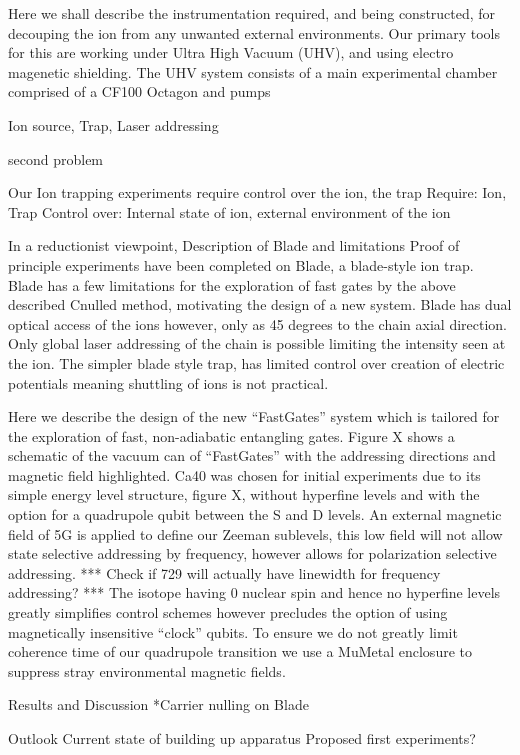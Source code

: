 Here we shall describe the instrumentation required, and being constructed, for decouping the ion from any unwanted external environments. Our primary tools for this are working under Ultra High Vacuum (UHV), and using electro magenetic shielding. The UHV system consists of a main experimental chamber comprised of a CF100 Octagon and pumps









Ion source,
Trap,
Laser addressing

second problem

Our Ion trapping experiments require control over the ion, the trap
Require:
Ion, Trap
Control over:
Internal state of ion, external environment of the ion

In a reductionist viewpoint, 
Description of Blade and limitations Proof of principle experiments
have been completed on Blade, a blade-style ion trap. Blade has a few
limitations for the exploration of fast gates by the above described
Cnulled method, motivating the design of a new system.  Blade has dual
optical access of the ions however, only as 45 degrees to the chain
axial direction. Only global laser addressing of the chain is possible
limiting the intensity seen at the ion. The simpler blade style trap,
has limited control over creation of electric potentials meaning
shuttling of ions is not practical.


\subtitle{FastGates Apparatus}

Here we describe the design of the new ``FastGates'' system which is
tailored for the exploration of fast, non-adiabatic entangling
gates. Figure X shows a schematic of the vacuum can of ``FastGates''
with the addressing directions and magnetic field highlighted. Ca40
was chosen for initial experiments due to its simple energy level
structure, figure X, without hyperfine levels and with the option for
a quadrupole qubit between the S and D levels. An external magnetic
field of 5G is applied to define our Zeeman sublevels, this low field
will not allow state selective addressing by frequency, however allows
for polarization selective addressing. *** Check if 729 will actually
have linewidth for frequency addressing? *** The isotope having 0
nuclear spin and hence no hyperfine levels greatly simplifies control
schemes however precludes the option of using magnetically insensitive
``clock'' qubits. To ensure we do not greatly limit coherence time of
our quadrupole transition we use a MuMetal enclosure to suppress stray
environmental magnetic fields.



Results and Discussion
    *Carrier nulling on Blade

Outlook
    Current state of building up apparatus
    Proposed first experiments?

  

